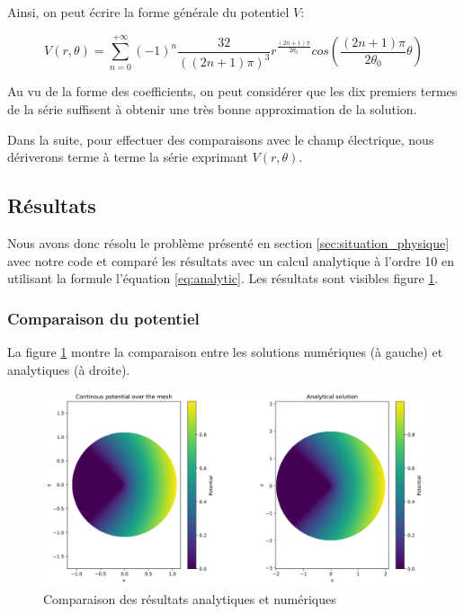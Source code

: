 \documentclass{article}
\begin{document}
Ainsi, on peut écrire la forme générale du potentiel $V$:

\begin{equation}
    V(r, \theta) = \sum_{n=0}^{+\infty}
    \left(-1\right)^n \frac{32}{
        \left((2n+1)\pi\right)^3}
    r^{\frac{(2n+1)\pi}{2 \theta_0}}
    cos\left(\frac{(2n+1)\pi}{2\theta_0}\theta\right)
    \label{eq:analytic}
\end{equation}

Au vu de la forme des coefficients, on peut considérer que 
les dix premiers termes de la série suffisent à obtenir une
très bonne approximation de la solution.

Dans la suite, pour effectuer des comparaisons avec 
le champ électrique, nous dériverons terme à terme
la série exprimant $V(r,\theta)$.

\newpage

\subsection{Résultats}
\label{sec:results}

Nous avons donc résolu le problème présenté en section
\ref{sec:situation_physique} avec notre code et comparé
les résultats avec un calcul analytique à l'ordre 10
en utilisant la formule l'équation \ref{eq:analytic}.
Les résultats sont visibles figure \ref{fig:analytic_vs_numeric}.

\subsubsection{Comparaison du potentiel}

La figure \ref{fig:analytic_vs_numeric} montre la comparaison
entre les solutions numériques (à gauche) et analytiques (à droite).

\begin{figure}[!h]
    \centering
    \includegraphics[width=\textwidth]{img/comparison.png}
    \caption{Comparaison des résultats analytiques et numériques}
    \label{fig:analytic_vs_numeric}
\end{figure}
\end{document}
